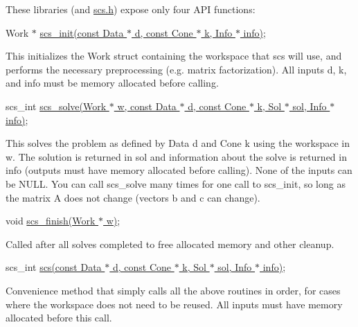 These libraries (and {\ttfamily \hyperlink{scs_8h}{scs.\-h}}) expose only four A\-P\-I functions\-:


\begin{DoxyItemize}
\item {\ttfamily Work $\ast$ \hyperlink{scs_8h_ac80aff1c3011a5cc31ba32c8e3689f01}{scs\-\_\-init(const Data $\ast$ d, const Cone $\ast$ k, Info $\ast$ info)};}

This initializes the Work struct containing the workspace that scs will use, and performs the necessary preprocessing (e.\-g. matrix factorization). All inputs {\ttfamily d}, {\ttfamily k}, and {\ttfamily info} must be memory allocated before calling.
\item {\ttfamily scs\-\_\-int \hyperlink{scs_8h_ae5a022dbf33560ad0564178ff61d535d}{scs\-\_\-solve(\-Work $\ast$ w, const Data $\ast$ d, const Cone $\ast$ k, Sol $\ast$ sol, Info $\ast$ info)};}

This solves the problem as defined by Data {\ttfamily d} and Cone {\ttfamily k} using the workspace in {\ttfamily w}. The solution is returned in {\ttfamily sol} and information about the solve is returned in {\ttfamily info} (outputs must have memory allocated before calling). None of the inputs can be N\-U\-L\-L. You can call {\ttfamily scs\-\_\-solve} many times for one call to {\ttfamily scs\-\_\-init}, so long as the matrix {\ttfamily A} does not change (vectors {\ttfamily b} and {\ttfamily c} can change).
\item {\ttfamily void \hyperlink{scs_8h_a444d62ce119a1e4762f87fe263369047}{scs\-\_\-finish(\-Work $\ast$ w)};}

Called after all solves completed to free allocated memory and other cleanup.
\item {\ttfamily scs\-\_\-int \hyperlink{scs_8h_a103f47be236f81ae085244d574997706}{scs(const Data $\ast$ d, const Cone $\ast$ k, Sol $\ast$ sol, Info $\ast$ info)};}

Convenience method that simply calls all the above routines in order, for cases where the workspace does not need to be reused. All inputs must have memory allocated before this call.
\end{DoxyItemize}

